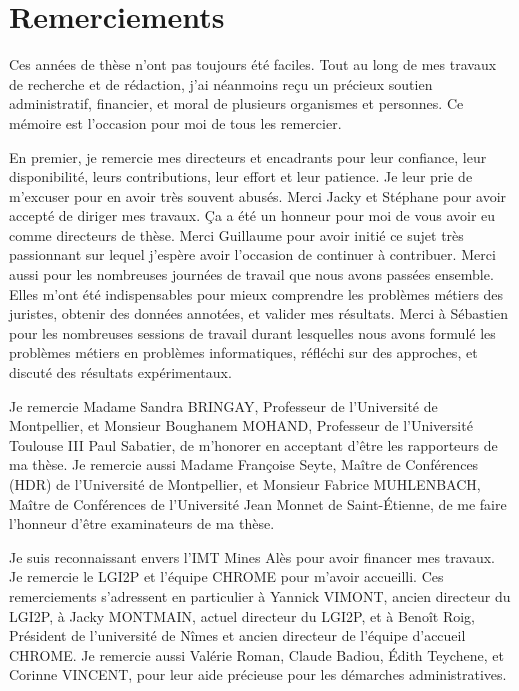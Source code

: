 \chapter*{Remerciements}
\label{sec:acknowledgement}
Ces années de thèse n'ont pas  toujours été faciles. Tout au long de mes travaux de recherche et de rédaction, j'ai néanmoins reçu un précieux soutien administratif, financier, et moral de plusieurs organismes et personnes. Ce mémoire est l'occasion pour moi de tous les remercier.

En premier, je remercie mes directeurs et encadrants pour leur confiance, leur disponibilité, leurs contributions, leur effort et leur patience. Je leur prie de m'excuser pour en avoir  très souvent abusés. Merci Jacky et Stéphane pour avoir accepté de diriger mes travaux. Ça a été un honneur pour moi de vous avoir eu comme directeurs de thèse. Merci Guillaume pour avoir initié ce sujet très passionnant sur lequel j'espère avoir l'occasion de continuer à contribuer. Merci aussi pour les nombreuses journées de travail que nous avons passées ensemble. Elles m'ont été indispensables pour mieux comprendre les problèmes métiers des juristes, obtenir des données annotées, et valider mes résultats. Merci à Sébastien pour les nombreuses sessions de travail durant lesquelles nous avons formulé les problèmes métiers en problèmes informatiques, réfléchi sur des approches, et discuté des résultats expérimentaux. 

Je remercie Madame Sandra BRINGAY, Professeur de l'Université de Montpellier, et 
Monsieur Boughanem MOHAND, Professeur de l'Université Toulouse III Paul Sabatier, de m'honorer en acceptant d'être les rapporteurs de ma thèse. Je remercie aussi Madame Françoise Seyte, Maître de Conférences (HDR) de l'Université de Montpellier, et  Monsieur Fabrice MUHLENBACH, Maître de Conférences de l'Université Jean Monnet de Saint-Étienne, de me faire l'honneur d'être examinateurs de ma thèse.

Je suis reconnaissant envers l'IMT Mines Alès pour avoir financer mes travaux. Je remercie le LGI2P et l'équipe CHROME pour m'avoir accueilli. Ces remerciements s'adressent en particulier à Yannick VIMONT, ancien directeur du LGI2P, à Jacky MONTMAIN, actuel directeur du LGI2P, et à Benoît Roig, Président de l'université de Nîmes et ancien directeur de l'équipe d'accueil CHROME. Je remercie aussi Valérie Roman, Claude Badiou, Édith  Teychene, et Corinne VINCENT, pour leur aide précieuse pour les démarches administratives. 

